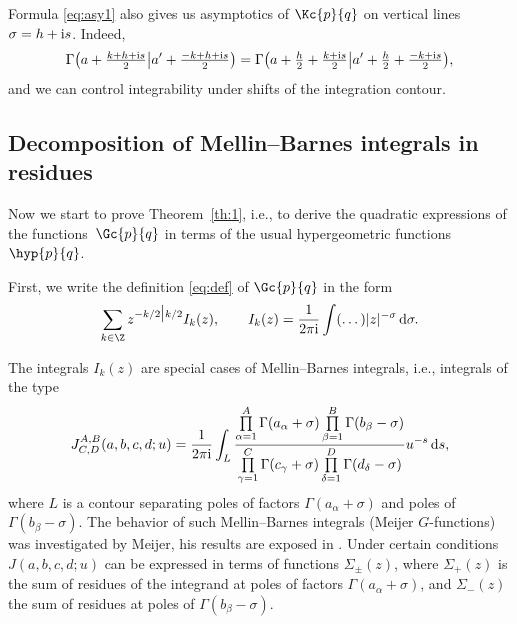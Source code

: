\begin{Remark}
Formula \eqref{eq:asy1} also gives us asymptotics of
$\Kc{p}{q}$ on vertical lines $\sigma=h+{\rm i}s$. Indeed,
\[
\Gamma\big(a+\tfrac{k+h+{\rm i}s}{2}\big|a'+\tfrac{-k+h+{\rm i}s}{2}\big)=
\Gamma\big(a+\tfrac h2+\tfrac{k+{\rm i}s}{2}\big|a'+\tfrac h2+\tfrac{-k+{\rm i}s}{2}\big),
\]
and we can control integrability under shifts of the integration contour.
\end{Remark}

\subsection{Decomposition of Mellin--Barnes integrals in residues}\label{ss:meijer}
Now we start to prove Theorem~\ref{th:1}, i.e., to derive
the quadratic expressions of the func\-tions~$\Gc{p}{q}$ in terms of
the usual hypergeometric functions $\hyp{p}{q}$.

First, we write the definition \eqref{eq:def} of $\Gc{p}{q}$ in the form
\[
\sum_{k\in \Z} z^{-k/2\big|k/2} I_k(z), \qquad
I_k(z)=\frac{1}{2\pi {\rm i}}\int (\dots)|z|^{-\sigma}\,{\rm d}\sigma.
\]

The integrals $I_k(z)$ are special cases of
Mellin--Barnes integrals, i.e., integrals of the type
\begin{equation}
J^{A,B}_{C,D}(a,b,c,d;u)=\frac 1{2\pi {\rm i}}\int_L \frac{\prod\limits_{\alpha=1}^A\Gamma(a_\alpha+\sigma)
\prod\limits_{\beta=1}^B\Gamma(b_\beta-\sigma)}
{\prod\limits_{\gamma=1}^C\Gamma(c_\gamma+\sigma)\prod\limits_{\delta=1}^D\Gamma(d_\delta-\sigma)} u^{-s}
\, {\rm d}s,
\label{eq:J}
\end{equation}
where $L$ is a contour separating poles of factors
$\Gamma(a_\alpha+\sigma)$ and poles of $\Gamma(b_\beta-\sigma)$.
The behavior of such Mellin--Barnes integrals
(Meijer $G$-functions) was investigated by Meijer,
his results are exposed in \cite{BW, Luke,Mar}.
Under certain conditions $J(a,b,c,d;u)$ can be expressed in terms
of functions $\Sigma_\pm(z)$, where
$\Sigma_+(z)$ is the sum of residues of the integrand at poles of
factors $\Gamma(a_\alpha+\sigma)$, and $\Sigma_-(z)$
the sum of residues at poles of $\Gamma(b_\beta-\sigma)$.

